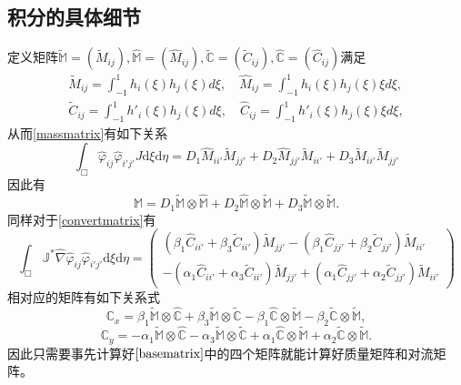 \documentclass[10pt,reqno, final]{ctexartutf8}
\begin{document}
\subsection{积分的具体细节}
定义矩阵$\widetilde{\mathbb M}=(\widetilde M_{ij}), \widehat{\mathbb M}=(\widehat M_{ij}), \widetilde{\mathbb C}=(\widetilde C_{ij}), \widehat{\mathbb C}=(\widehat C_{ij})$满足
\begin{equation}\label{basematrix}
\begin{split}
\widetilde M_{ij}=\int_{-1}^1h_i(\xi)h_{j}(\xi) d\xi, \quad \widehat M_{ij}=\int_{-1}^1h_i(\xi)h_{j}(\xi)\xi d\xi,\\
\widetilde C_{ij}=\int_{-1}^1h'_i(\xi)h_{j}(\xi) d\xi, \quad \widehat C_{ij}=\int_{-1}^1h'_i(\xi)h_{j}(\xi)\xi d\xi,
\end{split}
\end{equation}
从而\eqref{massmatrix}有如下关系
\begin{equation*}
 \int_\Box \widehat{\varphi}_{ij} \widehat{\varphi}_{i'j'}  J  \text{d}\xi\text{d}\eta
 = D_1 \widehat M_{ii'}\widetilde M_{jj'} + D_2\widehat M_{jj'}\widetilde M_{ii'}
        + D_3\widetilde M_{ii'}\widetilde M_{jj'}
\end{equation*}
因此有
\[
\mathbb{M} = D_1\widetilde {\mathbb M} \otimes \widehat {\mathbb M} +
D_2 \widehat{\mathbb M} \otimes \widetilde {\mathbb M} + D_3\widetilde {\mathbb M} \otimes \widetilde {\mathbb M}.\]
同样对于\eqref{convertmatrix}有
\begin{equation*}
\int_\Box
\mathbb{J}^{*}\widehat\nabla    \widehat{\varphi}_{ij}
\widehat{\varphi}_{i'j'}
\text{d}\xi\text{d}\eta
=
\left(
\begin{array}{c}
  (\beta_1\widehat C_{ii'} + \beta_3\widetilde C_{ii'} )\widetilde M_{jj'}
  - (\beta_1\widehat C_{jj'} + \beta_2\widetilde C_{jj'} )\widetilde M_{ii'}\\
  -(\alpha_1\widehat C_{ii'} + \alpha_3\widetilde C_{ii'} )\widetilde M_{jj'}
  + (\alpha_1\widehat C_{jj'} + \alpha_2\widetilde C_{jj'} )\widetilde M_{ii'}
\end{array}
\right)
\end{equation*}
相对应的矩阵有如下关系式
\[
\mathbb{C}_x = \beta_1\widetilde{\mathbb M}\otimes\widehat{\mathbb C} + \beta_3 \widetilde{\mathbb M} \otimes \widetilde{\mathbb C}
- \beta_1\widehat{\mathbb C} \otimes \widetilde{\mathbb M} - \beta_2 \widetilde{\mathbb C} \otimes \widetilde{\mathbb M}
,
\]
\[
\mathbb{C}_y = -\alpha_1\widetilde{\mathbb M}\otimes\widehat{\mathbb C} - \alpha_3 \widetilde{\mathbb M} \otimes \widetilde{\mathbb C}
+ \alpha_1\widehat{\mathbb C} \otimes \widetilde{\mathbb M} + \alpha_2 \widetilde{\mathbb C} \otimes \widetilde{\mathbb M}
.
\]
因此只需要事先计算好$\eqref{basematrix}$中的四个矩阵就能计算好质量矩阵和对流矩阵。
\end{document}
